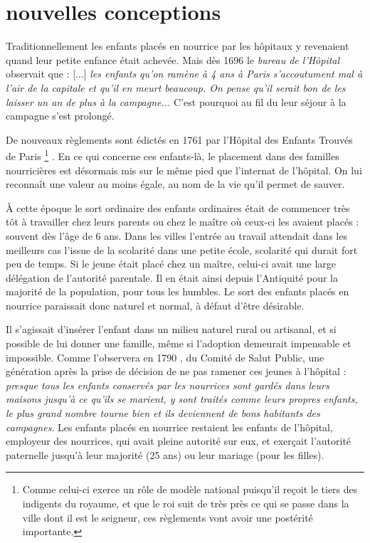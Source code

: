 \section{nouvelles conceptions}


 Traditionnellement les enfants placés en nourrice par les hôpitaux y revenaient quand leur petite enfance était achevée. Mais dès 1696 le \emph{bureau de l'Hôpital} observait que : [...] \emph{les enfants qu'on ramène à 4 ans à Paris s'accoutument mal à l'air de la capitale et qu'il en meurt beaucoup. On pense qu'il serait bon de les laisser un an de plus à la campagne...} C'est pourquoi au fil du  leur séjour à la campagne s'est prolongé.

 De nouveaux règlements sont édictés en 1761 par l'Hôpital des Enfants Trouvés de Paris%
\footnote{Comme celui-ci exerce un rôle de modèle national puisqu'il reçoit le tiers des indigents du royaume, et que le roi suit de très près ce qui se passe dans la ville dont il est le seigneur, ces règlements vont avoir une postérité importante.}%
. En ce qui concerne ces enfants-là, le placement dans des familles nourricières est désormais mis sur le même pied que l'internat de l'hôpital. On lui reconnaît une valeur au moins égale, au nom de la vie qu'il permet de sauver. 

 À cette époque le sort ordinaire des enfants ordinaires était de commencer très tôt à travailler chez leurs parents ou chez le maître où ceux-ci les avaient placés : souvent dès l'âge de 6 ans. Dans les villes l'entrée au travail attendait dans les meilleurs cas l'issue de la scolarité dans une petite école, scolarité qui durait fort peu de temps. Si le jeune était placé chez un maître, celui-ci avait une large délégation de l'autorité parentale. Il en était ainsi depuis l'Antiquité pour la majorité de la population, pour tous les humbles. Le sort des enfants placés en nourrice paraissait donc naturel et normal, à défaut d'être désirable.

 Il s'agissait d'insérer l'enfant dans un milieu naturel rural ou artisanal, et si possible de lui donner une famille, même si l'adoption demeurait impensable et impossible. Comme l'observera en 1790 , du Comité de Salut Public, une génération après la prise de décision de ne pas ramener ces jeunes à l'hôpital : \emph{presque tous les enfants conservés par les nourrices sont gardés dans leurs maisons jusqu'à ce qu'ils se marient, y sont traités comme leurs propres enfants, le plus grand nombre tourne bien et ils deviennent de bons habitants des campagnes}. Les enfants placés en nourrice restaient les enfants de l'hôpital, employeur des nourrices, qui avait pleine autorité sur eux, et exerçait l'autorité paternelle jusqu'à leur majorité (25 ans) ou leur mariage (pour les filles). 

